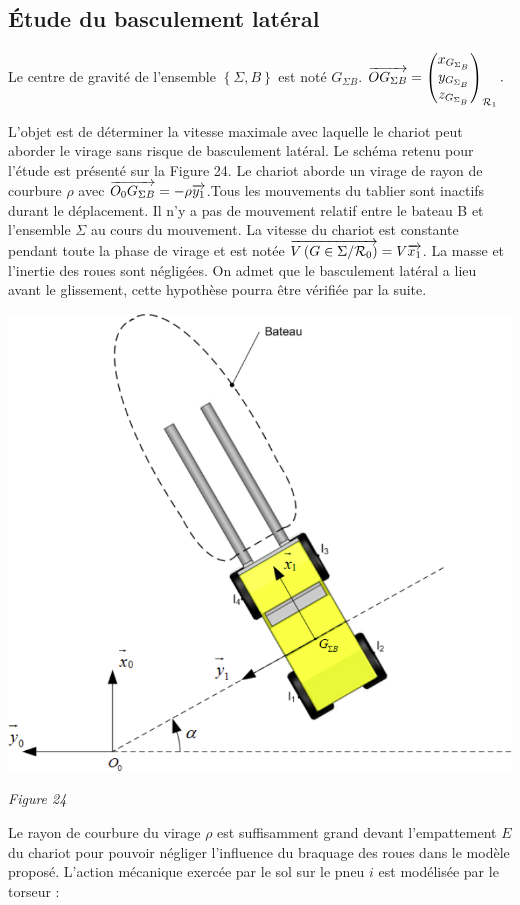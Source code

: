 \documentclass[10pt,fleqn]{article} %
\begin{document}
\subsection{Étude du basculement latéral}

Le centre de gravité de l’ensemble $\left\{\Sigma,B\right\}$ est noté $G_{\Sigma B}$.  $
\overrightarrow{OG_{\Sigma B}} = \begin{pmatrix}x_{G_{\Sigma_B}}\\y_{G_{\Sigma_B}}\\z_{G_{\Sigma_B}}\end{pmatrix}_{\mathcal{R}_1}.
$


L’objet est de déterminer la vitesse maximale avec laquelle le chariot peut aborder le virage sans risque de basculement latéral.
Le schéma retenu pour l’étude est présenté sur la Figure 24.
Le chariot aborde un virage de rayon de courbure $\rho$ avec $\overrightarrow{O_0G_{\Sigma B}}=-\rho \overrightarrow{y_1}$.Tous les mouvements du tablier sont inactifs durant le déplacement. Il n’y a pas de mouvement relatif entre le bateau B et l’ensemble $\Sigma$ au cours du mouvement.
La vitesse du chariot est constante pendant toute la phase de virage et est notée $\overrightarrow{V\left( {G} \in {\Sigma}/{\mathcal{R}_0}\right)}=V\overrightarrow{x_1}$. 
La masse et l’inertie des roues sont négligées.
On admet que le basculement latéral a lieu avant le glissement, cette hypothèse pourra être vérifiée par la suite.

\begin{center}
\includegraphics[width=.65\linewidth]{images/fig_24}

\textit{Figure 24}
\end{center}

Le rayon de courbure du virage $\rho$ est suffisamment grand devant l’empattement $E$ du chariot pour pouvoir négliger l’influence du braquage des roues dans le modèle proposé. L’action mécanique exercée par le sol sur le pneu $i$ est modélisée par le torseur :
\end{document}
